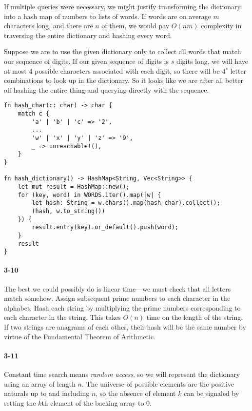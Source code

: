 \documentclass{report}
\begin{document}
If multiple queries were necessary, we might justify transforming the dictionary into a hash map of numbers to lists of words. If words are on average $m$ characters long, and there are $n$ of them, we would pay $O(nm)$ complexity in traversing the entire dictionary and hashing every word.

Suppose we are to use the given dictionary only to collect all words that match our sequence of digits. If our given sequence of digits is $s$ digits long, we will have at most 4 possible characters associated with each digit, so there will be $4^s$ letter combinations to look up in the dictionary. So it looks like we are after all better off hashing the entire thing and querying directly with the sequence.

\begin{lstlisting}
fn hash_char(c: char) -> char {
    match c {
        'a' | 'b' | 'c' => '2',
        ...
        'w' | 'x' | 'y' | 'z' => '9',
        _ => unreachable!(),
    }
}

fn hash_dictionary() -> HashMap<String, Vec<String>> {
    let mut result = HashMap::new();
    for (key, word) in WORDS.iter().map(|w| {
        let hash: String = w.chars().map(hash_char).collect();
        (hash, w.to_string())
    }) {
        result.entry(key).or_default().push(word);
    }
    result
}
\end{lstlisting}

\paragraph{3-10} The best we could possibly do is linear time---we must check that all letters match somehow. Assign subsequent prime numbers to each character in the alphabet. Hash each string by multiplying the prime numbers corresponding to each character in the string. This takes $O(n)$ time on the length of the string. If two strings are anagrams of each other, their hash will be the same number by virtue of the Fundamental Theorem of Arithmetic.

\paragraph{3-11} Constant time search means \emph{random access}, so we will represent the dictionary using an array of length $n$. The universe of possible elements are the positive naturals up to and including $n$, so the absence of element $k$ can be signaled by setting the $k$th element of the backing array to 0.
\end{document}
